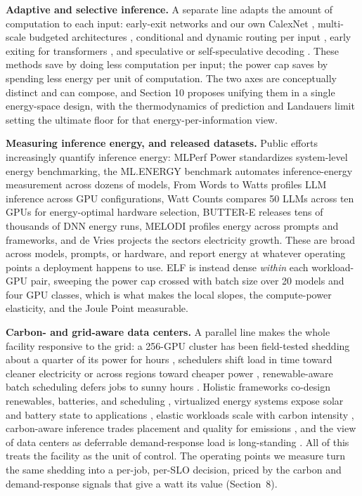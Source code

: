 \documentclass[3p,twocolumn]{elsarticle}
\begin{document}
\textbf{Adaptive and selective inference.} A separate line adapts the amount of computation to each input:
early-exit networks \cite{ref5} and our own CalexNet \cite{ref11}, multi-scale budgeted architectures \cite{ref54}, conditional and
dynamic routing per input \cite{ref6, ref7, ref55}, early exiting for transformers \cite{ref53}, and speculative or self-speculative
decoding \cite{ref8, ref52}. These methods save by doing less computation per input; the power cap saves by spending less energy per unit of
computation. The two axes are conceptually distinct and can compose, and Section 10 proposes unifying them in a single
energy-space design, with the thermodynamics of prediction \cite{ref9} and Landauer\textquotesingle s limit \cite{ref10} setting the ultimate
floor for that energy-per-information view.

\textbf{Measuring inference energy, and released datasets.} Public efforts increasingly quantify inference
energy: MLPerf Power \cite{ref31} standardizes system-level energy benchmarking, the ML.ENERGY benchmark \cite{ref32} automates
inference-energy measurement across dozens of models, From Words to Watts \cite{ref33} profiles LLM inference across GPU
configurations, Watt Counts \cite{ref48} compares 50 LLMs across ten GPUs for energy-optimal hardware selection,
BUTTER-E \cite{ref49} releases tens of thousands of DNN energy runs, MELODI \cite{ref50} profiles energy across prompts and
frameworks, and de Vries \cite{ref34} projects the sector\textquotesingle s electricity growth. These are broad across models, prompts,
or hardware, and report energy at whatever operating points a deployment happens to use. ELF is instead dense
\emph{within} each workload-GPU pair, sweeping the power cap crossed with batch size over 20 models and four
GPU classes, which is what makes the local slopes, the compute-power elasticity, and the Joule Point
measurable.

\textbf{Carbon- and grid-aware data centers.} A parallel line makes the whole facility responsive to the grid:
a 256-GPU cluster has been field-tested shedding about a quarter of its power for hours \cite{ref12}, schedulers shift
load in time toward cleaner electricity \cite{ref13} or across regions toward cheaper power \cite{ref41}, renewable-aware batch
scheduling defers jobs to sunny hours \cite{ref42}. Holistic frameworks co-design renewables, batteries, and scheduling
\cite{ref28}, virtualized energy systems expose solar and battery state to applications \cite{ref29}, elastic workloads scale
with carbon intensity \cite{ref30}, carbon-aware inference trades placement and quality for emissions \cite{ref51}, and the view
of data centers as deferrable demand-response load is long-standing \cite{ref14}. All of this treats the facility as the unit of control. The operating points we
measure turn the same shedding into a per-job, per-SLO decision, priced by the carbon and
demand-response signals that give a watt its value (Section~8).
\end{document}
